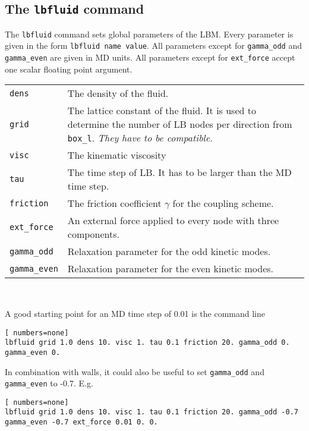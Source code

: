 \subsection*{The \lstinline|lbfluid| command}
The \lstinline{lbfluid} command sets global parameters of the LBM. Every
parameter is given in the form \lstinline|lbfluid name value|. 
All parameters except for \lstinline|gamma_odd| and  \lstinline|gamma_even|
are given in MD units. All parameters except for \lstinline|ext_force| accept
one scalar floating point argument. \\
\vspace{0,2cm}
\begin{tabular}{p{}p{}}
\lstinline|dens| & The density of the fluid.\\
\lstinline|grid| & The lattice constant of the fluid. It is used to determine the number of LB nodes 
per direction from \lstinline|box_l|. {\em They have to be compatible.} \\
\lstinline|visc| & The kinematic viscosity \\
\lstinline|tau| & The time step of LB. It has to be larger than the MD time step. \\
\lstinline|friction| & The friction coefficient $\gamma$ for the coupling scheme. \\
\lstinline|ext_force| & An external force applied to every node with three components. \\
\lstinline|gamma_odd| & Relaxation parameter for the odd kinetic modes. \\
\lstinline|gamma_even| & Relaxation parameter for the even kinetic modes.
\end{tabular} \\
\vspace{0,2cm}

A good starting point for an MD time step of 0.01 is the command line
\vspace{0,2cm}
\begin{lstlisting}[ numbers=none]
lbfluid grid 1.0 dens 10. visc 1. tau 0.1 friction 20. gamma_odd 0. gamma_even 0.
\end{lstlisting}
\vspace{0,2cm}

In combination with walls, it could also be useful to set \lstinline|gamma_odd| and
\lstinline|gamma_even| to -0.7. E.g. 
\vspace{0,2cm}
\begin{lstlisting}[ numbers=none]
lbfluid grid 1.0 dens 10. visc 1. tau 0.1 friction 20. gamma_odd -0.7 gamma_even -0.7 ext_force 0.01 0. 0.
\end{lstlisting}
\vspace{0,2cm}

